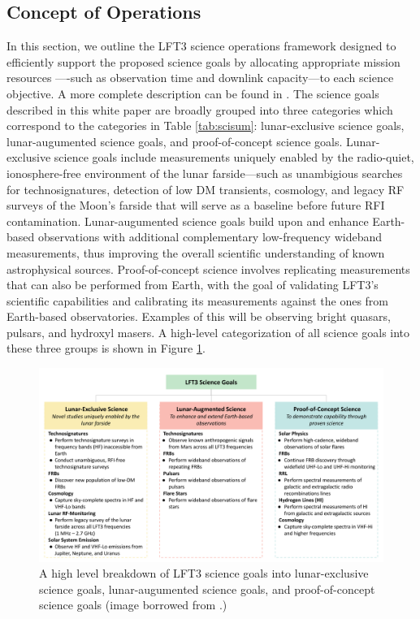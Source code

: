 \subsection{Concept of Operations}
\label{sec:conops}
In this section, we outline the LFT3 science operations framework designed to efficiently support the proposed science goals by allocating appropriate mission resources ----such as observation time and downlink capacity---to each science objective. A more complete description can be found in \cite{prabu2025lft3}. The science goals described in this white paper are broadly grouped into three categories which correspond to the categories in Table \ref{tab:scisum}: lunar-exclusive science goals, lunar-augumented science goals, and proof-of-concept science goals. Lunar-exclusive science goals include measurements uniquely enabled by the radio-quiet, ionosphere-free environment of the lunar farside---such as unambigious searches for technosignatures, detection of low DM transients, cosmology, and legacy RF surveys of the Moon's farside that will serve as a baseline before future RFI contamination. Lunar-augumented science goals build upon and enhance Earth-based observations with additional complementary low-frequency wideband measurements, thus improving the overall scientific understanding of known astrophysical sources. Proof-of-concept science involves replicating measurements that can also be performed from Earth, with the goal of validating LFT3's scientific capabilities and calibrating its measurements against the ones from Earth-based observatories. Examples of this will be observing bright quasars, pulsars, and hydroxyl masers. A high-level categorization of all science goals into these three groups is shown in Figure \ref{fig:sciencegoals}.


\begin{figure}
	\centering
	\includegraphics[width=\linewidth]{figures/LFT3ScienceGoals2.png}
	\caption{A high level breakdown of LFT3 science goals into lunar-exclusive science goals, lunar-augumented science goals, and proof-of-concept science goals (image borrowed from \cite{prabu2025lft3}.)}
	\label{fig:sciencegoals}
\end{figure}


